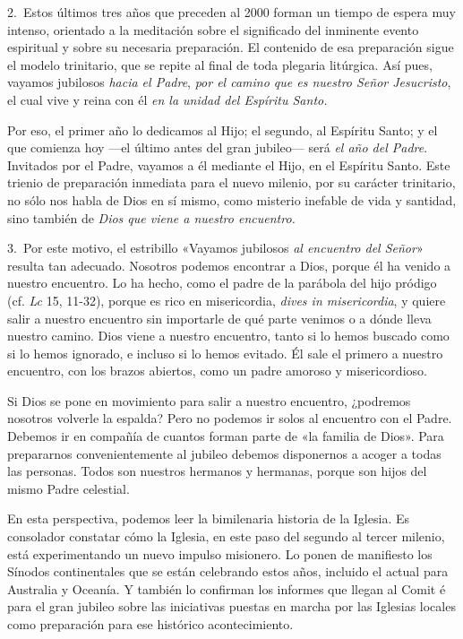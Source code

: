 2.~Estos últimos tres años que preceden al 2000 forman un tiempo de
espera muy intenso, orientado a la meditación sobre el significado del
inminente evento espiritual y sobre su necesaria preparación. El
contenido de esa preparación sigue el modelo trinitario, que se repite
al final de toda plegaria litúrgica. Así pues, vayamos jubilosos
\emph{hacia el Padre}, \emph{por el camino que es nuestro Señor
	Jesucristo}, el cual vive y reina con él \emph{en la unidad del Espíritu
	Santo.}

Por eso, el primer año lo dedicamos al Hijo; el segundo, al Espíritu
Santo; y el que comienza hoy ---el último antes del gran jubileo--- será
\emph{el año del Padre}. Invitados por el Padre, vayamos a él mediante
el Hijo, en el Espíritu Santo. Este trienio de preparación inmediata
para el nuevo milenio, por su carácter trinitario, no sólo nos habla de
Dios en sí mismo, como misterio inefable de vida y santidad, sino
también de \emph{Dios que viene a nuestro encuentro.}

3.~Por este motivo, el estribillo «Vayamos jubilosos \emph{al encuentro
	del Señor}» resulta tan adecuado. Nosotros podemos encontrar a Dios,
porque él ha venido a nuestro encuentro. Lo ha hecho, como el padre de
la parábola del hijo pródigo (cf. \emph{Lc} 15, 11-32), porque es rico
en misericordia, \emph{dives in misericordia}, y quiere salir a nuestro
encuentro sin importarle de qué parte venimos o a dónde lleva nuestro
camino. Dios viene a nuestro encuentro, tanto si lo hemos buscado como
si lo hemos ignorado, e incluso si lo hemos evitado. Él sale el primero
a nuestro encuentro, con los brazos abiertos, como un padre amoroso y
misericordioso.

Si Dios se pone en movimiento para salir a nuestro encuentro, ¿podremos
nosotros volverle la espalda? Pero no podemos ir solos al encuentro con
el Padre. Debemos ir en compañía de cuantos forman parte de «la familia
de Dios». Para prepararnos convenientemente al jubileo debemos
disponernos a acoger a todas las personas. Todos son nuestros hermanos y
hermanas, porque son hijos del mismo Padre celestial.

En esta perspectiva, podemos leer la bimilenaria historia de la Iglesia.
Es consolador constatar cómo la Iglesia, en este paso del segundo al
tercer milenio, está experimentando un nuevo impulso misionero. Lo ponen
de manifiesto los Sínodos continentales que se están celebrando estos
años, incluido el actual para Australia y Oceanía. Y también lo
confirman los informes que llegan al Comit é para el gran jubileo sobre
las iniciativas puestas en marcha por las Iglesias locales como
preparación para ese histórico acontecimiento.

